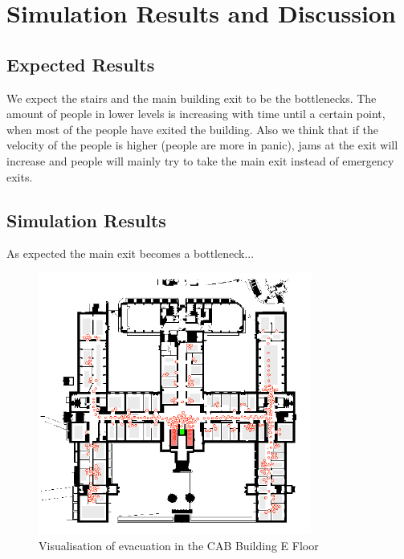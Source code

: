 \documentclass[11pt]{article}
\begin{document}
\section{Simulation Results and Discussion}

\subsection{Expected Results}

We expect the stairs and the main building exit to be the bottlenecks. The
amount of people in lower levels is increasing with time until a certain point,
when most of the people have exited the building. Also we think that if the 
velocity of the people is higher (people are more in panic), jams at the
exit will increase and people will mainly try to take the main exit instead of
emergency exits.


\subsection{Simulation Results}

As expected the main exit becomes a bottleneck...

\begin{figure}[h]
\centering
\includegraphics[width=0.8\textwidth]{./images/cab1.png}
\caption{Visualisation of evacuation in the CAB Building E Floor} 
\label{cab1}
\end{figure}
\end{document}
